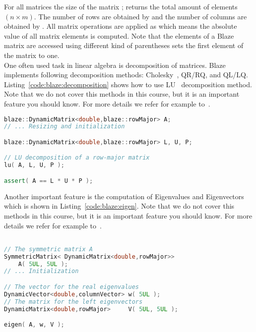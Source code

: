 \documentclass[11pt,fleqn]{book} %
\begin{document}
For all matrices the size of the matrix ; returns the total amount of elements $(n \times m)$. The number of rows are obtained by  and the number of columns are obtained by . All matrix operations are applied as  which means the absolute value of all matrix elements is computed. Note that the elements of a Blaze matrix are accessed using different kind of parentheses  sets the first element of the matrix to one.\\

One often used task in linear algebra is decomposition of matrices. Blaze implements following decomposition methods: Cholesky~\cite{cholesky2005resolution}, QR/RQ, and QL/LQ. Listing~\ref{code:blaze:decomposition} shows how to use LU~\cite{bunch1974triangular} decomposition method. Note that we do not cover this methods in this course, but it is an important feature you should know. For more details we refer for example to~\cite{press1992numerical}.

\begin{lstlisting}[language=c++,caption={Matrix decomposition methods in Blaze\label{code:blaze:decomposition}},float,floatplacement=tb]
blaze::DynamicMatrix<double,blaze::rowMajor> A;
// ... Resizing and initialization

blaze::DynamicMatrix<double,blaze::rowMajor> L, U, P;

// LU decomposition of a row-major matrix
lu( A, L, U, P );  

assert( A == L * U * P );
\end{lstlisting}

Another important feature is the computation of Eigenvalues and Eigenvectors which is shown in Listing~\ref{code:blaze:eigen}.  Note that we do not cover this methods in this course, but it is an important feature you should know. For more details we refer for example to~\cite{press1992numerical}. 

\begin{lstlisting}[language=c++,caption={Matrix decomposition methods in Blaze\label{code:blaze:eigen}},float,floatplacement=tb]

// The symmetric matrix A
SymmetricMatrix< DynamicMatrix<double,rowMajor>> 
    A( 5UL, 5UL );  
// ... Initialization

// The vector for the real eigenvalues
DynamicVector<double,columnVector> w( 5UL );    
// The matrix for the left eigenvectors   
DynamicMatrix<double,rowMajor>     V( 5UL, 5UL );  

eigen( A, w, V );
\end{lstlisting}
\end{document}
